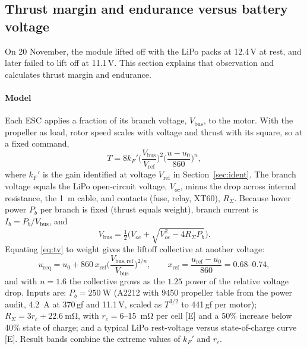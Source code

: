 \subsection{Thrust margin and endurance versus battery voltage}
\label{sec:bateria}

On 20 November, the module lifted off with the LiPo packs at 12.4\,V at rest, and later failed to lift off at 11.1\,V. This section explains that observation and calculates thrust margin and endurance.

\paragraph{Model}
Each ESC applies a fraction of its branch voltage, $V_{\mathrm{bus}}$, to the motor. With the propeller as load, rotor speed scales with voltage and thrust with its square, so at a fixed command,
\begin{equation}
  T=8k_F'\Big(\frac{V_{\mathrm{bus}}}{V_{\mathrm{ref}}}\Big)^2\Big(\frac{u-u_0}{860}\Big)^n ,
  \label{eq:tv}
\end{equation}
where $k_F'$ is the gain identified at voltage $V_{\mathrm{ref}}$ in Section~\ref{sec:ident}. The branch voltage equals the LiPo open-circuit voltage, $V_{oc}$, minus the drop across internal resistance, the \SI{1}{\metre} cable, and contacts (fuse, relay, XT60), $R_\Sigma$. Because hover power $P_b$ per branch is fixed (thrust equals weight), branch current is $I_b=P_b/V_{\mathrm{bus}}$, and
\begin{equation}
  V_{\mathrm{bus}}=\tfrac12\Big(V_{oc}+\sqrt{V_{oc}^2-4R_\Sigma P_b}\Big).
  \label{eq:vbus}
\end{equation}
Equating \eqref{eq:tv} to weight gives the liftoff collective at another voltage:
\begin{equation}
  u_{\mathrm{req}}=u_0+860\,x_{\mathrm{ref}}\Big(\frac{V_{\mathrm{bus,ref}}}{V_{\mathrm{bus}}}\Big)^{2/n},\qquad x_{\mathrm{ref}}=\frac{u_{\mathrm{ref}}-u_0}{860}=0.68\text{--}0.74,
  \label{eq:ureq}
\end{equation}
and with $n=1.6$ the collective grows as the $1.25$ power of the relative voltage drop. Inputs are: $P_b=\SI{250}{\watt}$ (A2212 with 9450 propeller table from the power audit, \SI{4.2}{\ampere} at 370\,gf and 11.1\,V, scaled as $T^{3/2}$ to 441\,gf per motor); $R_\Sigma=3r_c+\SI{22.6}{\milli\ohm}$, with $r_c=6$--\SI{15}{\milli\ohm} per cell [E] and a 50\% increase below 40\% state of charge; and a typical LiPo rest-voltage versus state-of-charge curve [E]. Result bands combine the extreme values of $k_F'$ and $r_c$.

